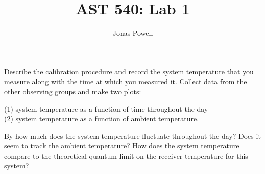 \documentclass[12pt]{article}
\newenvironment{part}[2][Part]{\begin{trivlist}
\item[\hskip \labelsep {\bfseries #1}\hskip \labelsep {\bfseries #2.}]}{\end{trivlist}}
\begin{document}

\title{AST 540: Lab 1}
\author{Jonas Powell}
\maketitle

\begin{part}{Measuring System Temperature Using Vane Calibration}
  Describe the calibration procedure and record the system temperature that you measure along with the time at which you measured it. Collect data from the other observing groups and make two plots:

  \bigskip
  (1) system temperature as a function of time throughout the day \\
  \indent(2) system temperature as a function of ambient temperature.


  \bigskip
  By how much does the system temperature fluctuate throughout the day? Does it seem to track the ambient temperature? How does the system temperature compare to the theoretical quantum limit on the receiver temperature for this system?
\end{part}
\end{document}
